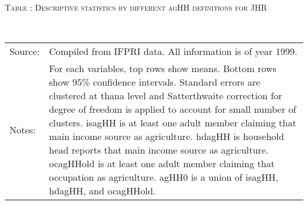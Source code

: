 \begin{minipage}[t]{14cm}
\hfil\textsc{\normalsize Table \thetable: Descriptive statistics by different agHH definitions for JHR\label{tab destat by agHH defs CRSE JHR}}\\
\setlength{\tabcolsep}{1pt}
\renewcommand{\arraystretch}{.70}
\hfil{}\\
\renewcommand{\arraystretch}{.7}
\setlength{\tabcolsep}{1pt}
\begin{tabular}{>{\hfill\scriptsize}p{1cm}<{}>{\scriptsize}p{12cm}<{\hfill}}
Source:& Compiled from IFPRI data. All information is of year 1999.\\
Notes: & For each variables, top rows show means. Bottom rows show 95\% confidence intervals. Standard errors are clustered at thana level and Satterthwaite correction for degree of freedom is applied to account for small number of clusters. \textsf{isagHH} is at least one adult member claiming that main income source as agriculture. \textsf{hdagHH} is household head reports that main income source as agriculture. \textsf{ocagHHold} is at least one adult member claiming that occupation as agriculture. \textsf{agHH0} is a union of \textsf{isagHH}, \textsf{hdagHH}, and \textsf{ocagHHold}. 
\end{tabular}
\end{minipage}\\ \vspace{2ex}


